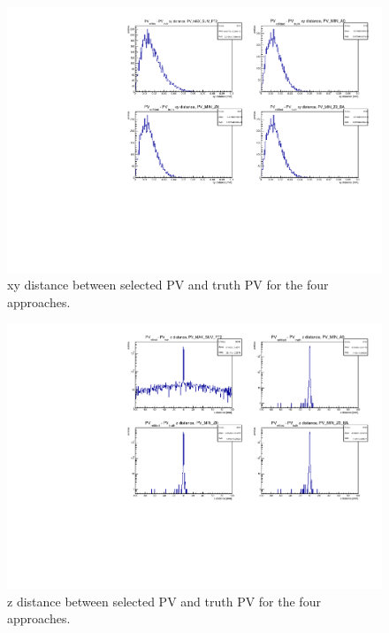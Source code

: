\begin{figure}[h]
  \centering
  \includegraphics[width=15cm]{figures/InternalNote_Preselection/ref_xy_distance.pdf}
  \caption{xy distance between selected PV and truth PV for the four approaches.}
  \label{fig:PVSVass_xydist}
\end{figure}

\begin{figure}[h]
  \centering
  \includegraphics[width=15cm]{figures/InternalNote_Preselection/z_ref_distance_wide.pdf}
  \caption{z distance between selected PV and truth PV for the four approaches.}
  \label{fig:PVSVass_zdist}
\end{figure}

